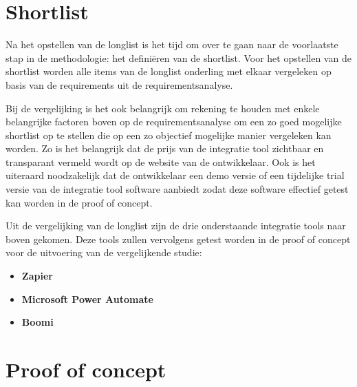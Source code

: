 \section{Shortlist}
\label{sec:ShortlistBP}

Na het opstellen van de longlist is het tijd om over te gaan naar de voorlaatste stap in de methodologie: het definiëren van de shortlist. Voor het opstellen van de shortlist worden alle items van de longlist onderling met elkaar vergeleken op basis van de requirements uit de requirementsanalyse.

\vspace{\baselineskip}

Bij de vergelijking is het ook belangrijk om rekening te houden met enkele belangrijke factoren boven op de requirementsanalyse om een zo goed mogelijke shortlist op te stellen die op een zo objectief mogelijke manier vergeleken kan worden. Zo is het belangrijk dat de prijs van de integratie tool zichtbaar en transparant vermeld wordt op de website van de ontwikkelaar. Ook is het uiteraard noodzakelijk dat de ontwikkelaar een demo versie of een tijdelijke trial versie van de integratie tool software aanbiedt zodat deze software effectief getest kan worden in de proof of concept.



\vspace{\baselineskip}

Uit de vergelijking van de longlist zijn de drie onderstaande integratie tools naar boven gekomen. Deze tools zullen vervolgens getest worden in de proof of concept voor de uitvoering van de vergelijkende studie:

\begin{itemize}
    \item \textbf{Zapier}
    \item \textbf{Microsoft Power Automate}
    \item \textbf{Boomi}
\end{itemize}





\section{Proof of concept}
\label{sec:Proof of conceptBP}

